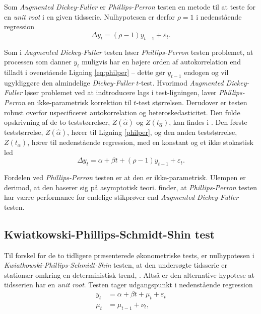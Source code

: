\documentclass[
  a4paper,
  oneside]{memoir}
\begin{document}
Som \emph{Augmented Dickey-Fuller} er \emph{Phillips-Perron} testen en metode til at teste for en \emph{unit root} i en given tidsserie. Nulhypotesen er derfor \(\rho=1\) i nedenstående regression
\begin{equation}
\Delta y_t = (\rho-1) y_{t-1} + \varepsilon_t.\label{eq:philper}
\end{equation}

Som i \emph{Augmented Dickey-Fuller} testen løser \emph{Phillips-Perron} testen problemet, at processen som danner \(y_t\) muligvis har en højere orden af autokorrelation end tilladt i ovenstående Ligning \eqref{eq:philper} -- dette gør \(y_{t-1}\) endogen og vil ugyldiggøre den almindelige \emph{Dickey-Fuller} \(t\)-test. Hvorimod \emph{Augmented Dickey-Fuller} løser problemet ved at indtroducere lags i test-ligningen, laver \emph{Phillips-Perron} en ikke-parametrisk korrektion til \(t\)-test størrelsen. Derudover er testen robust overfor uspecificeret autokorrelation og heteroskedasticitet. Den fulde opskrivning af de to teststørrelser, \(Z(\hat{\alpha})\) og \(Z(t_{\hat{\alpha}})\), kan findes i \citep{Phillips1988}. Den første teststørrelse, \(Z(\hat{\alpha})\), hører til Ligning \ref{philper}, og den anden teststørrelse, \(Z(t_{\hat{\alpha}})\), hører til nedenstående regression, med en konstant og et ikke stokastisk led
\[\Delta y_t =\alpha + \beta t + (\rho-1) y_{t-1} + \varepsilon_t.\]

Fordelen ved \emph{Phillips-Perron} testen er at den er ikke-parametrisk. Ulempen er derimod, at den baserer sig på asymptotisk teori. \citep{Davidson2004} finder, at \emph{Phillips-Perron} testen har værre performance for endelige stikprøver end \emph{Augmented Dickey-Fuller} testen.

\hypertarget{kwiatkowski-phillips-schmidt-shin-test}{%
\subsection{Kwiatkowski-Phillips-Schmidt-Shin test}\label{kwiatkowski-phillips-schmidt-shin-test}}

Til forskel for de to tidligere præsenterede økonometriske tests, er nulhypotesen i \emph{Kwiatkowski-Phillips-Schmidt-Shin} testen, at den undersøgte tidsserie er stationær omkring en deterministisk trend, \citep{Kwiatkowski1992}. Altså er den alternative hypotese at tidsserien har en \emph{unit root}. Testen tager udgangspunkt i nedenstående regression
\begin{align}
y_t&=\alpha+\beta t + \mu_t+\varepsilon_t\\
\mu_t&=\mu_{t-1}+\nu_t,
\end{align}
\end{document}
